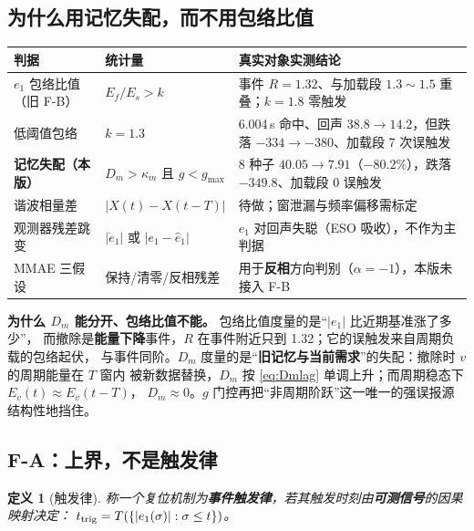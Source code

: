 \documentclass[11pt,a4paper]{article}
\newtheorem{definition}{定义}
\theoremstyle{remark}
\begin{document}
\subsection{为什么用记忆失配，而不用包络比值}\label{sec:criteria}
\begin{center}\footnotesize
\begin{tabular}{@{}p{3.2cm}p{5.4cm}p{6.2cm}@{}}
\toprule
判据 & 统计量 & 真实对象实测结论\\
\midrule
$e_1$ 包络比值（旧 F-B） & $E_f/E_s>k$ & 事件 $R=1.32$、与加载段 $1.3\sim1.5$ 重叠；$k=1.8$ 零触发\\
低阈值包络 & $k=1.3$ & 6.004\,s 命中、回声 $38.8\to14.2$，但跌落 $-334\to-380$、加载段 7 次误触发\\
\textbf{记忆失配（本版）} & $D_m>\kappa_m$ 且 $g<g_{\max}$ & 8 种子 $40.05\to7.91$（$-80.2\%$），跌落 $-349.8$、加载段 0 误触发\\
谐波相量差 & $|X(t)-X(t-T)|$ & 待做；窗泄漏与频率偏移需标定\\
观测器残差跳变 & $|\dot e_1|$ 或 $|e_1-\hat e_1|$ & $e_1$ 对回声失聪（ESO 吸收），不作为主判据\\
MMAE 三假设 & 保持/清零/反相残差 & 用于\textbf{反相}方向判别（$\alpha=-1$），本版未接入 F-B\\
\bottomrule
\end{tabular}
\end{center}

\noindent\textbf{为什么 $D_m$ 能分开、包络比值不能。} 包络比值度量的是“$|e_1|$ 比近期基准涨了多少”，
而撤除是\textbf{能量下降}事件，$R$ 在事件附近只到 1.32；它的误触发来自周期负载的包络起伏，
与事件同阶。$D_m$ 度量的是“\textbf{旧记忆与当前需求}”的失配：撤除时 $v$ 的周期能量在 $T$ 窗内
被新数据替换，$D_m$ 按 \eqref{eq:Dmlag} 单调上升；而周期稳态下 $E_v(t)\approx E_v(t-T)$，
$D_m\approx0$。$g$ 门控再把“非周期阶跃”这一唯一的强误报源结构性地挡住。

\subsection{F-A：上界，不是触发律}\label{sec:fa}
\begin{definition}[触发律]\label{def:trigger}
称一个复位机制为\textbf{事件触发律}，若其触发时刻由\textbf{可测信号}的因果映射决定：
$t_{\rm trig}=T\!\left(\{|e_1(\sigma)|:\sigma\le t\}\right)$。
\end{definition}
\end{document}
